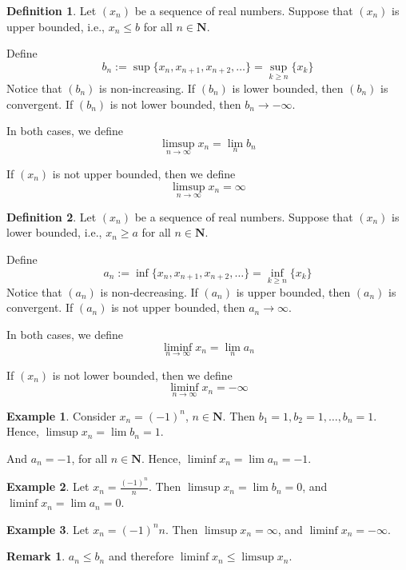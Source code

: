 \documentclass[12pt,a4paper]{article}
\theoremstyle{definition}
\newtheorem{remark}[theorem]{Remark}
\newtheorem{example}{Example}[section]
\newtheorem{definition}{Definition}[section]
\begin{document}
\begin{definition}
	Let $(x_n)$ be a sequence of real numbers. Suppose that $(x_n)$ is upper bounded, i.e., $x_n \leq b$ for all $n \in \textbf{N}$.
	
	Define
	\[
		b_n := \sup \{ x_n, x_{n+1}, x_{n+2}, \ldots \} = \sup_{k \geq n} \{ x_k \}
	\]
	Notice that $(b_n)$ is non-increasing. If $(b_n)$ is lower bounded, then $(b_n)$ is convergent. If $(b_n)$ is not lower bounded, then $b_n \longrightarrow - \infty$. 
	
	In both cases, we define \[ \limsup_{n \to \infty} x_n = \lim_n b_n \]
	
	If $(x_n)$ is not upper bounded, then we define \[ \limsup_{n \to \infty} x_n = \infty \]
\end{definition}

\begin{definition}
	Let $(x_n)$ be a sequence of real numbers. Suppose that $(x_n)$ is lower bounded, i.e., $x_n \geq a$ for all $n \in \textbf{N}$.
	
	Define
	\[
		a_n := \inf \{ x_n, x_{n+1}, x_{n+2}, \ldots \} = \inf_{k \geq n} \{ x_k \}
	\]
	Notice that $(a_n)$ is non-decreasing. If $(a_n)$ is upper bounded, then $(a_n)$ is convergent. If $(a_n)$ is not upper bounded, then $a_n \longrightarrow \infty$. 
	
	In both cases, we define \[ \liminf_{n \to \infty} x_n = \lim_n a_n \]
	
	If $(x_n)$ is not lower bounded, then we define \[ \liminf_{n \to \infty} x_n = - \infty \]
\end{definition}	

\begin{example}
	Consider $x_n = (-1)^n$, $n \in \textbf{N}$. Then $b_1 = 1, b_2 = 1, \ldots, b_n = 1$. Hence, $\limsup x_n = \lim b_n = 1$.
	
	And $a_n = -1$, for all $n \in \textbf{N}$. Hence, $\liminf x_n = \lim a_n = -1$.
\end{example}

\begin{example}
	Let $x_n = \frac{(-1)^n}{n}$. Then $\limsup x_n = \lim b_n = 0$, and $\liminf x_n = \lim a_n = 0$.
\end{example}

\begin{example}
	Let $x_n = (-1)^n n$. Then $\limsup x_n = \infty$, and $\liminf x_n = - \infty$.
\end{example}

\begin{remark}
	$a_n \leq b_n$ and therefore $\liminf x_n \leq \limsup x_n$.
\end{remark}
\end{document}
